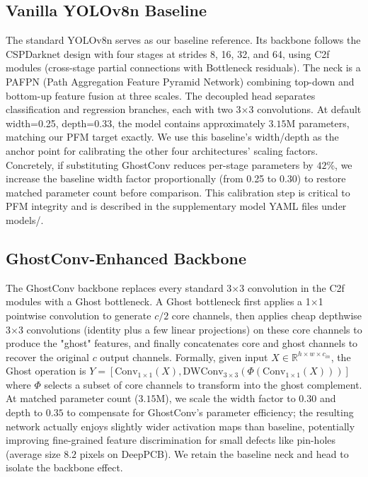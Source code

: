\documentclass[conference]{IEEEtran}
\newcommand{\simulated}[1]{#1}
\providecommand{\DIFadd}[1]{{\protect\color{blue}#1}}
\begin{document}
\subsection{\DIFadd{Vanilla YOLOv8n Baseline}}
The standard YOLOv8n serves as our baseline reference. Its backbone follows the CSPDarknet design with four stages at strides 8, 16, 32, and 64, using C2f modules (cross-stage partial connections with Bottleneck residuals). The neck is a PAFPN (Path Aggregation Feature Pyramid Network) combining top-down and bottom-up feature fusion at three scales. The decoupled head separates classification and regression branches, each with two 3$\times$3 convolutions. At default width=0.25, depth=0.33, the model contains approximately $\simulated{3.15}$M parameters, matching our PFM target exactly. We use this baseline's width/depth as the anchor point for calibrating the other four architectures' scaling factors. Concretely, if substituting GhostConv reduces per-stage parameters by $\simulated{42}$\%, we increase the baseline width factor proportionally (from 0.25 to $\simulated{0.30}$) to restore matched parameter count before comparison. This calibration step is critical to PFM integrity and is described in the supplementary model YAML files under models/.

\subsection{\DIFadd{GhostConv-Enhanced Backbone}}
\DIFadd{The GhostConv backbone replaces every standard 3$\times$3 convolution in the C2f modules with a Ghost bottleneck.} \DIFadd{A Ghost bottleneck first applies a 1$\times$1 pointwise convolution to generate $c/2$ core channels, then applies cheap depthwise 3$\times$3 convolutions (identity plus a few linear projections) on these core channels to produce the "ghost" features, and finally concatenates core and ghost channels to recover the original $c$ output channels.} \DIFadd{Formally, given input $X \in \mathbb{R}^{h \times w \times c_{in}}$, the Ghost operation is $Y = [\text{Conv}_{1\times1}(X), \text{DWConv}_{3\times3}(\Phi(\text{Conv}_{1\times1}(X)))]$ where $\Phi$ selects a subset of core channels to transform into the ghost complement.} \DIFadd{At matched parameter count ($\simulated{3.15}$M), we scale the width factor to $\simulated{0.30}$ and depth to $\simulated{0.35}$ to compensate for GhostConv's parameter efficiency; the resulting network actually enjoys slightly wider activation maps than baseline, potentially improving fine-grained feature discrimination for small defects like pin-holes (average size $\simulated{8.2}$ pixels on DeepPCB).} \DIFadd{We retain the baseline neck and head to isolate the backbone effect.}
\end{document}
